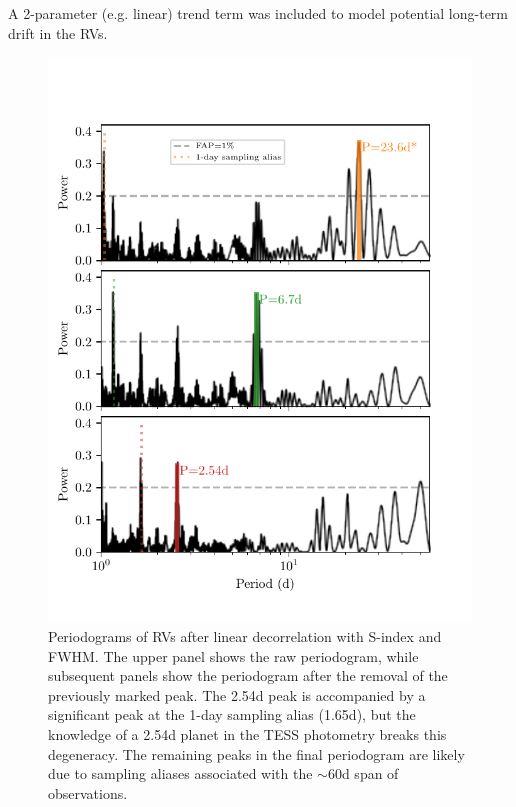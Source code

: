 \documentclass[fleqn,usenatbib]{mnras}
\newcommand{\TSindexperiod}{ $ 39.0 \pm 11.0 $ }
\begin{document}
A 2-parameter (e.g. linear) trend term was included to model potential long-term drift in the RVs.

\begin{figure}
	\includegraphics[width=\columnwidth, trim={0.3cm 1.1cm 0.8cm 1.3cm}]{TOI755_decorrelation_periodograms}
    \caption{Periodograms of RVs after linear decorrelation with S-index and FWHM. The upper panel shows the raw periodogram, while subsequent panels show the periodogram after the removal of the previously marked peak. The 2.54d peak is accompanied by a significant peak at the 1-day sampling alias (1.65d), but the knowledge of a 2.54d planet in the TESS photometry breaks this degeneracy. The remaining peaks in the final periodogram are likely due to sampling aliases associated with the $\sim60$d span of observations.}
    \label{fig:rv_decorr}
\end{figure}
\end{document}
